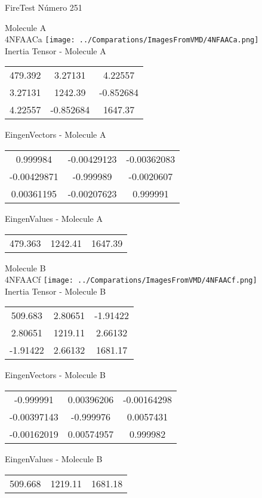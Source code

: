 \vtab[-2cm]
\begin{center}
{\large FireTest \tab Número 251}
\end{center}
\begin{multicols}{2}
\begin{center}

Molecule A \\ 
4NFAACa
\texttt{[image: ../Comparations/ImagesFromVMD/4NFAACa.png]}
\\
Inertia Tensor - Molecule A \\
\vtab

\begin{tabular}{|c c c|}
479.392	 & 	3.27131	 & 	4.22557	 \\
3.27131	 & 	1242.39	 & 	-0.852684	 \\
4.22557	 & 	-0.852684	 & 	1647.37
\end{tabular}

\vtab
 EingenVectors - Molecule A     \\
\vtab
\begin{tabular}{|c c c|}
0.999984	 & 	-0.00429123	 & 	-0.00362083	 \\
-0.00429871	 & 	-0.999989	 & 	-0.0020607	 \\
0.00361195	 & 	-0.00207623	 & 	0.999991
\end{tabular}

\vtab
 EingenValues - Molecule A     \\
\vtab
\begin{tabular}{|c c c|}
479.363	 & 	1242.41	 & 	1647.39	 \\
\end{tabular}
\columnbreak

Molecule B \\ 
4NFAACf
\texttt{[image: ../Comparations/ImagesFromVMD/4NFAACf.png]}
\\
Inertia Tensor - Molecule B \\
\vtab

\begin{tabular}{|c c c|}
509.683	 & 	2.80651	 & 	-1.91422	 \\
2.80651	 & 	1219.11	 & 	2.66132	 \\
-1.91422	 & 	2.66132	 & 	1681.17
\end{tabular}

\vtab
 EingenVectors - Molecule B     \\
\vtab
\begin{tabular}{|c c c|}
-0.999991	 & 	0.00396206	 & 	-0.00164298	 \\
-0.00397143	 & 	-0.999976	 & 	0.0057431	 \\
-0.00162019	 & 	0.00574957	 & 	0.999982
\end{tabular}

\vtab
 EingenValues - Molecule B     \\
\vtab
\begin{tabular}{|c c c|}
509.668	 & 	1219.11	 & 	1681.18	 \\
\end{tabular}

\end{center}
\end{multicols}

